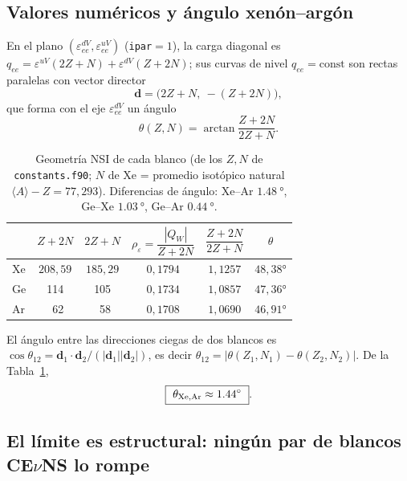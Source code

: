 \documentclass[11pt,a4paper]{article}
\newcommand{\eps}{\varepsilon}
\newcommand{\QW}{Q_{W}}
\newcommand{\code}[1]{\texttt{#1}}
\begin{document}
\subsection{Valores num\'ericos y \'angulo xen\'on--arg\'on}
\label{sec:angulo}

En el plano $(\eps_{ee}^{dV},\eps_{ee}^{uV})$ (\code{ipar}$=1$), la carga
diagonal es $q_{ee} = \eps^{uV}(2Z+N) + \eps^{dV}(Z+2N)$; sus curvas de nivel
$q_{ee}=\text{const}$ son rectas paralelas con vector director
\begin{equation}
  \label{eq:blind_dir}
  \mathbf{d} = \bigl(2Z+N,\ -(Z+2N)\bigr),
\end{equation}
que forma con el eje $\eps_{ee}^{dV}$ un \'angulo
\begin{equation}
  \label{eq:theta_blind}
  \theta(Z,N) = \arctan\!\frac{Z+2N}{2Z+N}.
\end{equation}

\begin{table}[h]
\centering
\begin{tabular}{@{}lccccc@{}}
\toprule
 & $Z+2N$ & $2Z+N$ & $\rho_{\eps}=\dfrac{|\QW|}{Z+2N}$
 & $\dfrac{Z+2N}{2Z+N}$ & $\theta$ \\
\midrule
Xe & $208{,}59$ & $185{,}29$ & $0{,}1794$ & $1{,}1257$ & $48{,}38\si{\degree}$ \\
Ge & 114 & 105 & $0{,}1734$ & $1{,}0857$ & $47{,}36\si{\degree}$ \\
Ar & \ 62 & \ 58 & $0{,}1708$ & $1{,}0690$ & $46{,}91\si{\degree}$ \\
\bottomrule
\end{tabular}
\caption{Geometr\'ia NSI de cada blanco (de los $Z,N$ de \code{constants.f90};
$N$ de Xe = promedio isot\'opico natural $\langle A\rangle-Z=77{,}293$).
Diferencias de \'angulo: Xe--Ar $\SI{1.48}{\degree}$, Ge--Xe
$\SI{1.03}{\degree}$, Ge--Ar $\SI{0.44}{\degree}$.}
\label{tab:geom}
\end{table}

El \'angulo entre las direcciones ciegas de dos blancos es
$\cos\theta_{12}=\mathbf{d}_{1}\!\cdot\!\mathbf{d}_{2}/
(|\mathbf{d}_{1}||\mathbf{d}_{2}|)$, es decir
$\theta_{12}=|\theta(Z_{1},N_{1}) - \theta(Z_{2},N_{2})|$. De la
Tabla~\ref{tab:geom},
\begin{equation}
  \label{eq:angle}
  \boxed{\ \theta_{\rm Xe,Ar} \approx \SI{1.44}{\degree}\ }.
\end{equation}

\subsection{El l\'imite es estructural: ning\'un par de blancos CE$\nu$NS lo rompe}
\label{sec:estructural}
\end{document}
